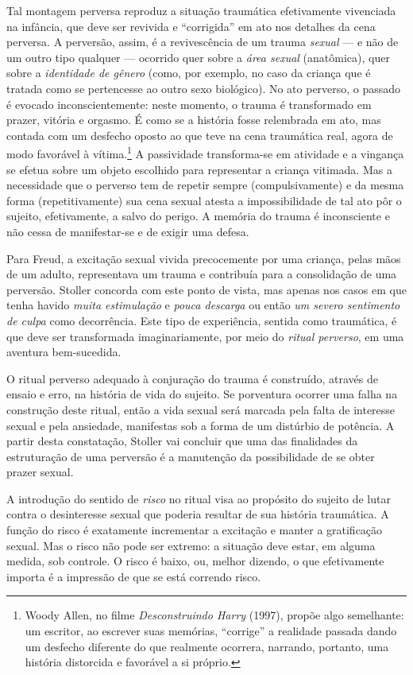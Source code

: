 Tal montagem perversa reproduz a situação traumática efetivamente vivenciada
na infância, que deve ser revivida e “corrigida” em ato nos detalhes da
cena perversa. A perversão, assim, é a revivescência de um trauma
\textit{sexual} --- e não de um outro tipo qualquer --- ocorrido quer sobre a
\textit{área sexual} (anatômica), quer sobre a \textit{identidade de
gênero} (como, por exemplo, no caso da criança que é tratada como se
pertencesse ao outro sexo biológico). No ato perverso, o passado é evocado
inconscientemente: neste momento, o trauma é transformado em prazer,
vitória e orgasmo. É como se a história fosse relembrada em ato, mas
contada com um desfecho oposto ao que teve na cena traumática real, agora
de modo favorável à vítima.\footnote{ Woody Allen, no filme
\textit{Desconstruindo Harry} (1997), propõe algo semelhante: um escritor,
ao escrever suas memórias, “corrige” a realidade passada dando um desfecho
diferente do que realmente ocorrera, narrando, portanto, uma história
distorcida e favorável a si próprio.} A passividade transforma-se em
atividade e a vingança se efetua sobre um objeto escolhido para representar
a criança vitimada. Mas a necessidade que o perverso tem de repetir sempre
(compulsivamente) e da mesma forma (repetitivamente) sua cena sexual atesta
a impossibilidade de tal ato pôr o sujeito, efetivamente, a salvo do
perigo. A memória do trauma é inconsciente e não cessa de manifestar-se e
de exigir uma defesa.

Para Freud, a excitação sexual vivida precocemente por uma criança, pelas
mãos de um adulto, representava um trauma e contribuía para a consolidação
de uma perversão. Stoller concorda com este ponto de vista, mas apenas nos
casos em que tenha havido \textit{muita estimulação} e \textit{pouca
descarga} ou então \textit{um severo sentimento de culpa} como decorrência.
Este tipo de experiência, sentida como traumática, é que deve ser
transformada imaginariamente, por meio do \textit{ritual perverso}, em uma
aventura bem-sucedida.

O ritual perverso adequado à conjuração do trauma é construído, através de
ensaio e erro, na história de vida do sujeito. Se porventura ocorrer uma
falha na construção deste ritual, então a vida sexual será marcada pela
falta de interesse sexual e pela ansiedade, manifestas sob a forma de um
distúrbio de potência. A partir desta constatação, Stoller vai concluir que
uma das finalidades da estruturação de uma perversão é a manutenção da
possibilidade de se obter prazer sexual.

A introdução do sentido de \textit{risco} no ritual visa ao propósito do
sujeito de lutar contra o desinteresse sexual que poderia resultar de sua
história traumática. A função do risco é exatamente incrementar a
excitação e manter a gratificação sexual. Mas o risco não pode ser extremo:
a situação deve estar, em alguma medida, sob controle. O risco é baixo, ou,
melhor dizendo, o que efetivamente importa é a impressão de que se está
correndo risco.

